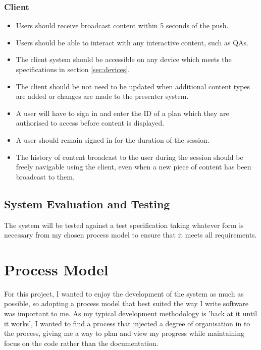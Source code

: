 \documentclass[a4papert,11pt,notitlepage]{ltxdoc}
\begin{document}
\subsubsection{Client}
\begin{itemize}
\item Users should receive broadcast content within 5 seconds of the push.
\item Users should be able to interact with any interactive content, such as QAs.
\item The client system should be accessible on any device which meets the specifications in section \ref{sec:devices}.
\item The client should be not need to be updated when additional content types are added or changes are made to the presenter system.
\item A user will have to sign in and enter the ID of a plan which they are authorised to access before content is displayed.
\item A user should remain signed in for the duration of the session.
\item The history of content broadcast to the user during the session should be freely navigable using the client, even when a new piece of content has been broadcast to them.
\end{itemize}

\subsection{System Evaluation and Testing}
The system will be tested against a test specification taking whatever form is necessary from my chosen process model to ensure that it meets all requirements.

\section{Process Model}
For this project, I wanted to enjoy the development of the system as much as possible, so adopting a process model that best suited the way I write software was important to me. As my typical development methodology is 'hack at it until it works', I wanted to find a process that injected a degree of organisation in to the process, giving me a way to plan and view my progress while maintaining focus on the code rather than the documentation.
\end{document}
